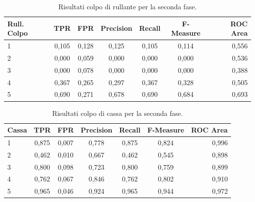 \begin{table}[h!]
	\begin{center}
		\begin{tabular}{l|c|c|c|c|c|r} %
			\textbf{Rull. Colpo} & \textbf{TPR} & \textbf{FPR} & \textbf{Precision} & \textbf{Recall} & \textbf{F-Measure} & \textbf{ROC Area}\\
			\hline
			1 & 0,105 & 0,128 & 0,125 & 0,105 & 0,114 & 0,556 \\
			2 & 0,000 & 0,059 & 0,000 & 0,000 & 0,000 & 0,536 \\
			3 & 0,000 & 0,078 & 0,000 & 0,000 & 0,000 & 0,388 \\
			4 & 0,367 & 0,265 & 0,297 & 0,367 & 0,328 & 0,505 \\
			5 & 0,690 & 0,271 & 0,678 & 0,690 & 0,684 & 0,693 \\
		\end{tabular}
		\caption{Risultati colpo di rullante per la seconda fase.}
		\label{tab:sn_hit_res_2}
	\end{center}
\end{table}

\begin{table}[h!]
	\begin{center}
		\begin{tabular}{l|c|c|c|c|c|r} %
			\textbf{Cassa} & \textbf{TPR} & \textbf{FPR} & \textbf{Precision} & \textbf{Recall} & \textbf{F-Measure} & \textbf{ROC Area}\\
			\hline
			1 & 0,875 & 0,007 & 0,778 & 0,875 & 0,824 & 0,996 \\
			2 & 0,462 & 0,010 & 0,667 & 0,462 & 0,545 & 0,898 \\
			3 & 0,800 & 0,098 & 0,723 & 0,800 & 0,759 & 0,899 \\
			4 & 0,762 & 0,067 & 0,846 & 0,762 & 0,802 & 0,910 \\
			5 & 0,965 & 0,046 & 0,924 & 0,965 & 0,944 & 0,972 \\
		\end{tabular}
		\caption{Risultati colpo di cassa per la seconda fase.}
		\label{tab:kick_res_2}
	\end{center}
\end{table}


